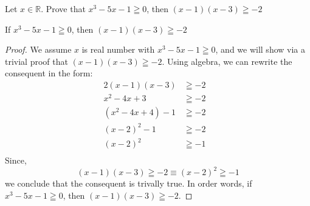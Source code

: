\begin{example}
Let $x \in \mathbb{R}$. Prove that $x^3 -5x - 1 \geqq 0$, then $(x-1)(x-3)\geqq -2$

\begin{tcolorbox}
	\begin{theorem}
		If $x^3 -5x - 1 \geqq 0$, then $(x-1)(x-3)\geqq -2$
	\end{theorem}
\end{tcolorbox}

\begin{proof}
We assume $x$ is real number with $x^3 -5x - 1 \geqq 0$, and we will show via a trivial proof that $(x-1)(x-3)\geqq -2$. Using algebra, we can rewrite the consequent in the form: 
\begin{alignat*}{2}
 	(x-1)(x-3) 			& \geqq -2 & \\
 	x^2 -4x + 3  		& \geqq -2\\
 	(x^2 -4x + 4) - 1 	& \geqq -2& \\
 	(x-2)^2 -1			& \geqq -2& \\
 	(x-2)^2				& \geqq -1& \\
\end{alignat*}
Since, 
	\begin{equation}
		(x-1)(x-3) \geqq -2 \equiv (x-2)^2 \geqq -1  \nonumber 
	\end{equation}
we conclude that the consequent is trivally true. In order words, if $x^3 -5x - 1 \geqq 0$, then $(x-1)(x-3)\geqq -2$. 
\end{proof}
\end{example}



